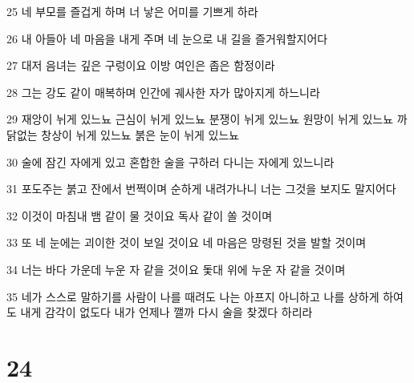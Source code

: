 \par 25 네 부모를 즐겁게 하며 너 낳은 어미를 기쁘게 하라
\par 26 내 아들아 네 마음을 내게 주며 네 눈으로 내 길을 즐거워할지어다
\par 27 대저 음녀는 깊은 구렁이요 이방 여인은 좁은 함정이라
\par 28 그는 강도 같이 매복하며 인간에 궤사한 자가 많아지게 하느니라
\par 29 재앙이 뉘게 있느뇨 근심이 뉘게 있느뇨 분쟁이 뉘게 있느뇨 원망이 뉘게 있느뇨 까닭없는 창상이 뉘게 있느뇨 붉은 눈이 뉘게 있느뇨
\par 30 술에 잠긴 자에게 있고 혼합한 술을 구하러 다니는 자에게 있느니라
\par 31 포도주는 붉고 잔에서 번쩍이며 순하게 내려가나니 너는 그것을 보지도 말지어다
\par 32 이것이 마침내 뱀 같이 물 것이요 독사 같이 쏠 것이며
\par 33 또 네 눈에는 괴이한 것이 보일 것이요 네 마음은 망령된 것을 발할 것이며
\par 34 너는 바다 가운데 누운 자 같을 것이요 돛대 위에 누운 자 같을 것이며
\par 35 네가 스스로 말하기를 사람이 나를 때려도 나는 아프지 아니하고 나를 상하게 하여도 내게 감각이 없도다 내가 언제나 깰까 다시 술을 찾겠다 하리라

\chapter{24}


